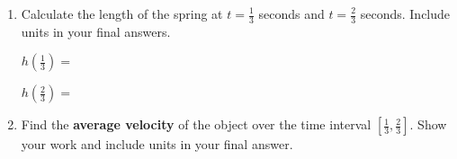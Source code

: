\documentclass[12pt]{article}
\renewcommand{\emph}[1]{\textsf{\textbf{#1}}}
\newcounter{probcount}
\newcounter{subprobcount}
\newenvironment{subproblems}{%
\begin{enumerate}%
\setcounter{enumi}{\value{subprobcount}}%
\renewcommand{\theenumi}{\emph{\alph{enumi}}}}%
{\setcounter{subprobcount}{\value{enumi}}\end{enumerate}}
\begin{document}

\begin{subproblems}

\item Calculate the length of the spring at $t=\frac{1}{3}$ seconds and $t=\frac{2}{3}$ seconds. Include units in your final answers.\\

\vspace{.1in}

$h\left(\frac{1}{3}\right)=$

\vspace{.1in}

$h\left(\frac{2}{3}\right)=$

\vspace{.1in}

\item Find the \textbf{average velocity} of the object over the time interval $\left[ \frac{1}{3}, \frac{2}{3}\right]$. Show your work and include units in your final answer.

\vfill
\vfill


\end{subproblems}

\end{document}
